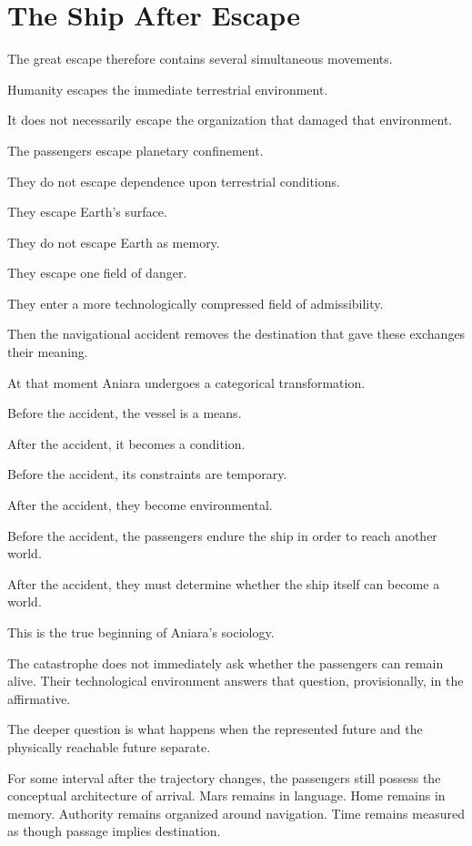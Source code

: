 \documentclass[11pt,oneside]{book}
\theoremstyle{definition}
\theoremstyle{remark}
\begin{document}
\section{The Ship After Escape}

The great escape therefore contains several simultaneous movements.

Humanity escapes the immediate terrestrial environment.

It does not necessarily escape the organization that damaged that environment.

The passengers escape planetary confinement.

They do not escape dependence upon terrestrial conditions.

They escape Earth's surface.

They do not escape Earth as memory.

They escape one field of danger.

They enter a more technologically compressed field of admissibility.

Then the navigational accident removes the destination that gave these exchanges their meaning.

At that moment Aniara undergoes a categorical transformation.

Before the accident, the vessel is a means.

After the accident, it becomes a condition.

Before the accident, its constraints are temporary.

After the accident, they become environmental.

Before the accident, the passengers endure the ship in order to reach another world.

After the accident, they must determine whether the ship itself can become a world.

This is the true beginning of Aniara's sociology.

The catastrophe does not immediately ask whether the passengers can remain alive. Their technological environment answers that question, provisionally, in the affirmative.

The deeper question is what happens when the represented future and the physically reachable future separate.

For some interval after the trajectory changes, the passengers still possess the conceptual architecture of arrival. Mars remains in language. Home remains in memory. Authority remains organized around navigation. Time remains measured as though passage implies destination.
\end{document}
